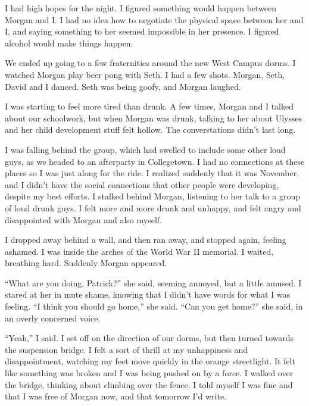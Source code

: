 I had high hopes for the night.  I figured something would happen between Morgan
and I.  I had no idea how to negotiate the physical space between her and I, and
saying something to her seemed impossible in her presence.  I figured alcohol
would make things happen.

We ended up going to a few fraternities around the new West Campus dorms.  I
watched Morgan play beer pong with Seth.  I had a few shots.  Morgan, Seth,
David and I danced.  Seth was being goofy, and Morgan laughed.  

I was starting to feel more tired than drunk.  A few times, Morgan and I talked
about our schoolwork, but when Morgan was drunk, talking to her about Ulysses
and her child development stuff felt hollow.  The converstations didn't last
long.

I was falling behind the group, which had swelled to include some other loud
guys, as we headed to an afterparty in Collegetown.  I had no connections at
these places so I was just along for the ride.  I realized suddenly that it was
November, and I didn't have the social connections that other people were
developing, despite my best efforts.  I stalked behind Morgan, listening to her
talk to a group of loud drunk guys.  I felt more and more drunk and unhappy, and
felt angry and disappointed with Morgan and also myself.

I dropped away behind a wall, and then ran away, and stopped again, feeling
ashamed.   I was inside the arches of the World War II memorial.  I waited,
breathing hard.  Suddenly Morgan appeared.  

``What are you doing, Patrick?'' she said, seeming annoyed, but a little amused.
I stared at her in mute shame, knowing that I didn't have words for what I was
feeling.  ``I think you should go home,'' she said.  ``Can you get home?'' she
said, in an overly concerned voice.

``Yeah,'' I said.  I set off on the direction of our dorms, but then turned
towards the suspension bridge.  I felt a sort of thrill at my unhappiness and
disappointment, watching my feet move quickly in the orange streetlight.  It
felt like something was broken and I was being pushed on by a force.  I walked
over the bridge, thinking about climbing over the fence.  I told myself I was
fine and that I was free of Morgan now, and that tomorrow I'd write.

\section{}


